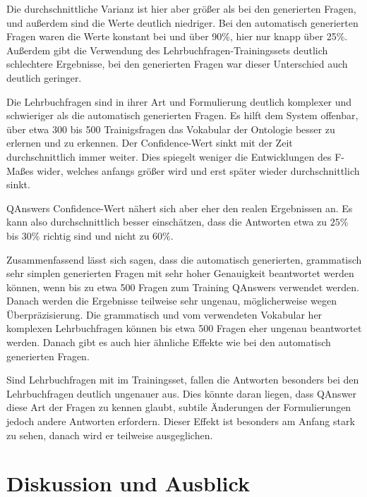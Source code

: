 \documentclass[utf8,biblatex]{lni}
\begin{document}
Die durchschnittliche Varianz ist hier aber größer als bei den generierten Fragen, und außerdem sind die Werte deutlich niedriger.
Bei den automatisch generierten Fragen waren die Werte konstant bei und über 90\%, hier nur knapp über 25\%.
Außerdem gibt die Verwendung des Lehrbuchfragen-Trainingssets deutlich schlechtere Ergebnisse, bei den generierten Fragen war dieser Unterschied auch deutlich geringer.

Die Lehrbuchfragen sind in ihrer Art und Formulierung deutlich komplexer und schwieriger als die automatisch generierten Fragen.
Es hilft dem System offenbar, über etwa 300 bis 500 Trainigsfragen das Vokabular der Ontologie besser zu erlernen und zu erkennen.
Der Confidence-Wert sinkt mit  der Zeit durchschnittlich immer weiter.
Dies spiegelt weniger die Entwicklungen des F-Maßes wider, welches anfangs größer wird und erst später wieder durchschnittlich sinkt.

QAnswers Confidence-Wert nähert sich aber eher den realen Ergebnissen an.
Es kann also durchschnittlich besser einschätzen, dass die Antworten etwa zu $25\%$ bis $30\%$ richtig sind und nicht zu $60\%$.

Zusammenfassend lässt sich sagen, dass die automatisch generierten, grammatisch sehr simplen generierten Fragen mit sehr hoher Genauigkeit beantwortet werden können,
wenn bis zu etwa 500 Fragen zum Training QAnswers verwendet werden.
Danach werden die Ergebnisse teilweise sehr ungenau, möglicherweise wegen Überpräzisierung.
Die grammatisch und vom verwendeten Vokabular her komplexen Lehrbuchfragen können bis etwa 500 Fragen eher ungenau beantwortet werden.
Danach gibt es auch hier ähnliche Effekte wie bei den automatisch generierten Fragen.

Sind Lehrbuchfragen mit im Trainingsset, fallen die Antworten besonders bei den Lehrbuchfragen deutlich ungenauer aus.
Dies könnte daran liegen, dass QAnswer diese Art der Fragen zu kennen glaubt, subtile Änderungen der Formulierungen jedoch andere Antworten erfordern.
Dieser Effekt ist besonders am Anfang stark zu sehen, danach wird er teilweise ausgeglichen.

\section{Diskussion und Ausblick}
\end{document}
